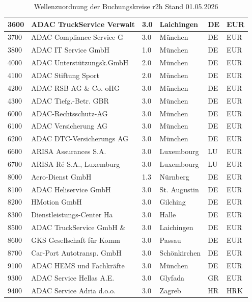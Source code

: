 \begin{table}
\begin{tabularx}{\textwidth}{|l|l|l|l|l|l|}
3600 & ADAC TruckService Verwalt & 3.0 & Laichingen & DE & EUR \\ \hline
3700 & ADAC Compliance Service G & 3.0 & München & DE & EUR \\ \hline
3800 & ADAC IT Service GmbH & 1.0 & München & DE & EUR \\ \hline
4000 & ADAC Unterstützungsk.GmbH & 2.0 & München & DE & EUR \\ \hline
4100 & ADAC Stiftung Sport & 2.0 & München & DE & EUR \\ \hline
4200 & ADAC RSB AG \& Co. oHG & 3.0 & München & DE & EUR \\ \hline
4300 & ADAC Tiefg.-Betr. GBR & 3.0 & München & DE & EUR \\ \hline
6000 & ADAC-Rechtsschutz-AG & 3.0 & München & DE & EUR \\ \hline
6100 & ADAC Versicherung AG & 3.0 & München & DE & EUR \\ \hline
6200 & ADAC DTC-Versicherungs AG & 3.0 & München & DE & EUR \\ \hline
6600 & ARISA Assurances S.A. & 3.0 & Luxembourg & LU & EUR \\ \hline
6700 & ARISA Ré S.A., Luxemburg & 3.0 & Luxembourg & LU & EUR \\ \hline
8000 & Aero-Dienst GmbH & 1.3 & Nürnberg & DE & EUR \\ \hline
8100 & ADAC Heliservice GmbH & 3.0 & St. Augustin & DE & EUR \\ \hline
8200 & HMotion GmbH & 3.0 & Gilching & DE & EUR \\ \hline
8300 & Dienstleistungs-Center Ha & 3.0 & Halle & DE & EUR \\ \hline
8500 & ADAC TruckService GmbH \& & 3.0 & Laichingen & DE & EUR \\ \hline
8600 & GKS Gesellschaft für Komm & 3.0 & Passau & DE & EUR \\ \hline
8700 & Car-Port Autotransp. GmbH & 3.0 & Schönkirchen & DE & EUR \\ \hline
9100 & ADAC HEMS und Fachkräfte & 3.0 & München & DE & EUR \\ \hline
9300 & ADAC Service Hellas A.E. & 3.0 & Glyfada & GR & EUR \\ \hline
9400 & ADAC Service Adria d.o.o. & 3.0 & Zagreb & HR & HRK \\ \hline
\end{tabularx}
\caption{Wellenzuordnung der Buchungskreise \gls{r2h} Stand 01.05.2026}
\label{tab:wellenzuordnung}
\end{table}